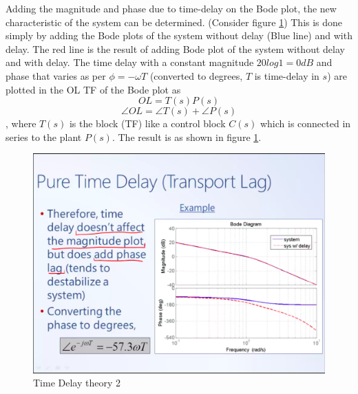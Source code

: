 Adding the magnitude and phase due to time-delay on the Bode plot, the new characteristic of the system can be determined. (Consider figure \ref{Fig_RC_TD_2}) This is done simply by adding the Bode plots of the system without delay (Blue line) and with delay. The red line is the result of adding Bode plot of the system without delay and with delay. The time delay with a constant magnitude $20 log 1 = 0 dB$ and phase that varies as per $\phi = -\omega T$ (converted to degrees, $T$ is time-delay in $s$) are plotted in the OL TF of the Bode plot as $$ OL = T(s)P(s) $$ $$ \angle OL = \angle T(s) + \angle P(s) $$, where $T(s)$ is the block (TF) like a control block $C(s)$ which is connected in series to the plant $P(s)$. The result is as shown in figure \ref{Fig_RC_TD_2}.

\begin{figure}[h!]
	\centering
	\includegraphics[width=\linewidth]{Bilder/RC_TimeDelay_2}
	\caption{Time Delay theory 2}
	\label{Fig_RC_TD_2}
\end{figure}
